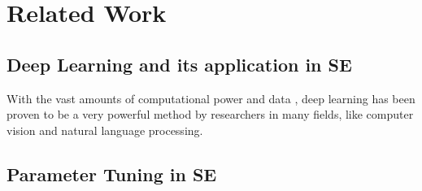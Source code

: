 \section{Related Work}


\subsection{Deep Learning and its application in SE}
With the vast amounts of computational power and data , deep learning has been proven to be a very powerful method by researchers in many fields, like computer vision and natural language processing\cite{krizhevsky2012imagenet,mikolov2013distributed,sutskever2014sequence}.
\subsection{Parameter Tuning in SE}



